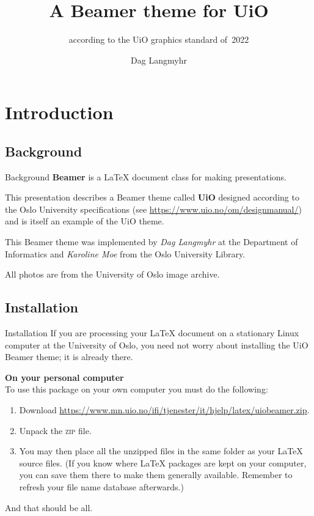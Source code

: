 \documentclass[UKenglish,aspectratio=169]{beamer}
\author{Dag Langmyhr}
\title{A Beamer theme for UiO}
\subtitle{according to the UiO graphics standard of~2022}
\newcommand{\zip}{\textsc{zip}}
\begin{document}
\uiofrontpage[dept={Department of Informatics},
  info={Combined user guide and doc},
  image={Villa_Eika}, inverted, smaller]

\section{Introduction}
\subsection{Background}

\begin{frame}{Background}
  \textbf{Beamer} is a \LaTeX{} document class for making presentations.

  \medskip
  This presentation describes a Beamer theme called \textbf{UiO}
  designed according to the Oslo University
  specifications (see
    {\small\url{https://www.uio.no/om/designmanual/}})
  and is itself an example of the UiO theme.

  \medskip
  This Beamer theme was implemented by \emph{Dag Langmyhr} at the
  Department of Informatics and \emph{Karoline Moe} from the Oslo
  University Library.

  \bigskip
  \scriptsize
  All photos are from the University of Oslo image archive.
\end{frame}

\subsection{Installation}
\begin{frame}{Installation}
If you are processing your \LaTeX{} document on a stationary Linux
computer at the University of Oslo, you need not worry about
installing the UiO Beamer theme; it is already there.

\medskip
\textbf{On your personal computer}\\
To use this package on your own computer you must do the following:
\begin{enumerate}
\item Download
  {\footnotesize\url{https://www.mn.uio.no/ifi/tjenester/it/hjelp/latex/uiobeamer.zip}}.

\item Unpack the \zip{} file.

\item You may then place all the
  unzipped files in the same folder
  as your \LaTeX{} source files. (If you know where \LaTeX{}
    packages are kept on your computer, you 
    can save them there to make them generally available. Remember to
    refresh your file name database afterwards.)
\end{enumerate}
And that should be all.
\end{frame}
\end{document}
